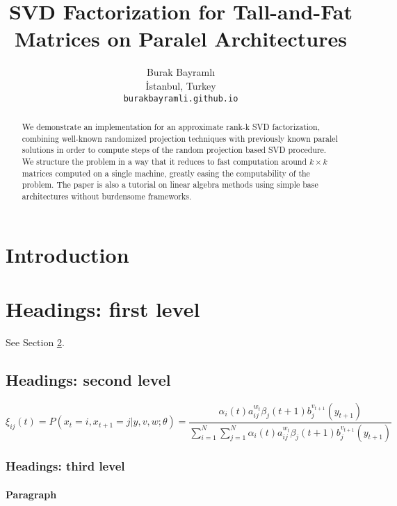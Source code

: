 \documentclass{article}
\title{SVD Factorization for Tall-and-Fat Matrices on Paralel Architectures}
\author{
  Burak Bayramlı \\
  İstanbul, Turkey\\
  \texttt{burakbayramli.github.io} 
}
\begin{document}
\maketitle

\begin{abstract}
We demonstrate an implementation for an approximate rank-k SVD factorization,
combining well-known randomized projection techniques with previously known
paralel solutions in order to compute steps of the random projection based SVD
procedure. We structure the problem in a way that it reduces to fast computation
around $k \times k$ matrices computed on a single machine, greatly easing the
computability of the problem. The paper is also a tutorial on linear algebra
methods using simple base architectures without burdensome frameworks. 
\end{abstract}




\section{Introduction}
\lipsum[2]
\lipsum[3]


\section{Headings: first level}
\label{sec:headings}

\lipsum[4] See Section \ref{sec:headings}.

\subsection{Headings: second level}
\lipsum[5]
\begin{equation}
\xi _{ij}(t)=P(x_{t}=i,x_{t+1}=j|y,v,w;\theta)= {\frac {\alpha _{i}(t)a^{w_t}_{ij}\beta _{j}(t+1)b^{v_{t+1}}_{j}(y_{t+1})}{\sum _{i=1}^{N} \sum _{j=1}^{N} \alpha _{i}(t)a^{w_t}_{ij}\beta _{j}(t+1)b^{v_{t+1}}_{j}(y_{t+1})}}
\end{equation}

\subsubsection{Headings: third level}
\lipsum[6]

\paragraph{Paragraph}
\lipsum[7]
\end{document}
